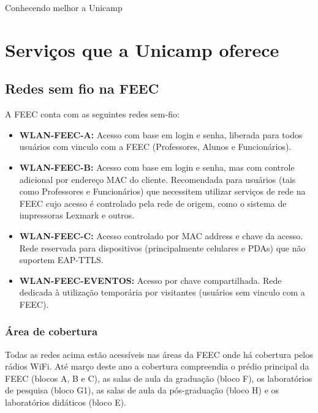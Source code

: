 
\begin{story}{Conhecendo melhor a Unicamp}

\section*{Serviços que a Unicamp oferece}

\subsection*{Redes sem fio na FEEC}

A FEEC conta com as seguintes redes sem-fio:

\begin{itemize}
\item \textbf{WLAN-FEEC-A:} Acesso com base em login e senha, liberada para todos usuários com vinculo com a FEEC (Professores, Alunos e Funcionários).
\item \textbf{WLAN-FEEC-B:} Acesso com base em login e senha, mas com controle adicional por endereço MAC do cliente. Recomendada para usuários (tais como Professores e Funcionários) que necessitem utilizar serviços de rede na FEEC cujo acesso é controlado pela rede de origem, como o sistema de impressoras Lexmark e outros.
\item \textbf{WLAN-FEEC-C:} Acesso controlado por MAC address e chave da acesso. Rede reservada para dispositivos (principalmente celulares e PDAs) que não suportem EAP-TTLS.
\item \textbf{WLAN-FEEC-EVENTOS:} Acesso por chave compartilhada. Rede dedicada à utilização temporária por visitantes (usuários sem vinculo com a FEEC).
\end{itemize}

\subsubsection*{Área de cobertura}

Todas as redes acima estão acessíveis nas áreas da FEEC onde há cobertura pelos rádios WiFi. Até março deste ano a cobertura compreendia o prédio principal da FEEC (blocos A, B e C), as salas de aula da graduação (bloco F), os laboratórios de pesquisa (bloco G1), as salas de aula da pós-graduação (bloco H) e os laboratórios didáticos (bloco E).


\end{story}
